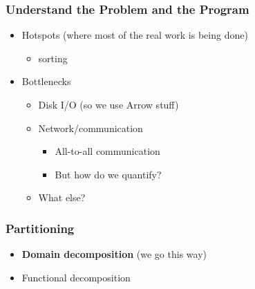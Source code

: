 \documentclass{beamer}
\begin{document}
\begin{frame}
\frametitle{Understand the Problem and the Program}

\begin{itemize}
  \item Hotspots (where most of the real work is being done)
    \begin{itemize}
      \item sorting
    \end{itemize}
  \item Bottlenecks
    \begin{itemize}
      \item Disk I/O (so we use Arrow stuff)
      \item Network/communication
       \begin{itemize}
        \item All-to-all communication
        \item But how do we quantify?
       \end{itemize}
      \item What else?
    \end{itemize}
\end{itemize}
    
\end{frame}

\begin{frame}
\frametitle{Partitioning}

\begin{itemize}
  \item \textbf{Domain decomposition} (we go this way)
  \item Functional decomposition
\end{itemize}
  
\end{frame}
\end{document}
